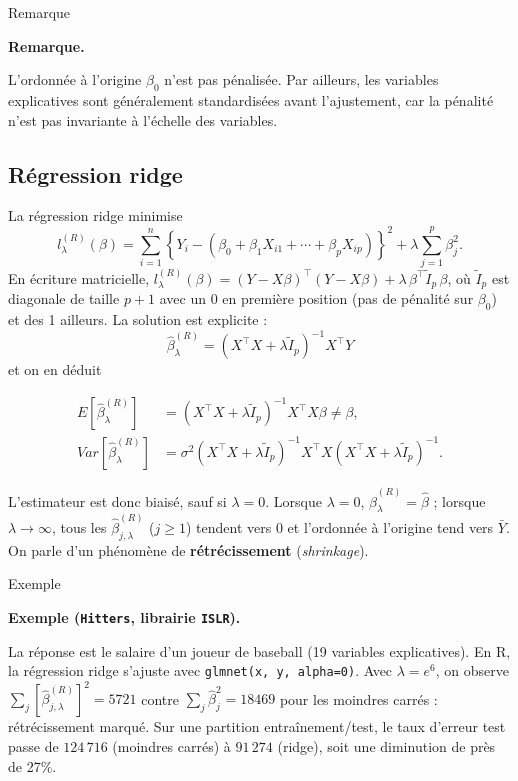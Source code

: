 \documentclass[
  french,
  letterpaper,
  DIV=11,
  numbers=noendperiod]{scrreprt}
\begin{document}
{Remarque}

\textbf{Remarque.}

L'ordonnée à l'origine \(\beta_0\) n'est pas pénalisée. Par ailleurs,
les variables explicatives sont généralement standardisées avant
l'ajustement, car la pénalité n'est pas invariante à l'échelle des
variables.

\subsection{Régression ridge}\label{ruxe9gression-ridge}

La régression ridge minimise
\[l^{(R)}_\lambda(\beta) = \sum_{i=1}^n\left\{Y_i - (\beta_0 + \beta_1 X_{i1} + \cdots + \beta_p X_{ip})\right\}^2 + \lambda\sum_{j=1}^p\beta_j^2.\]
En écriture matricielle,
\(l^{(R)}_\lambda(\beta) = (Y - X\beta)^\top(Y-X\beta) + \lambda\,\beta^\top\tilde I_p\,\beta\),
où \(\tilde I_p\) est diagonale de taille \(p+1\) avec un 0 en première
position (pas de pénalité sur \(\beta_0\)) et des 1 ailleurs. La
solution est explicite :
\[\boxed{\hat\beta^{(R)}_\lambda = (X^\top X + \lambda\tilde I_p)^{-1}X^\top Y}\]
et on en déduit

\[
\begin{aligned}
E[\hat\beta^{(R)}_\lambda] &= (X^\top X + \lambda\tilde I_p)^{-1}X^\top X\beta \neq \beta,\\
Var[\hat\beta^{(R)}_\lambda] &= \sigma^2(X^\top X + \lambda\tilde I_p)^{-1}X^\top X(X^\top X + \lambda\tilde I_p)^{-1}.
\end{aligned}
\]

L'estimateur est donc biaisé, sauf si \(\lambda = 0\). Lorsque
\(\lambda = 0\), \(\hat\beta^{(R)}_\lambda = \hat\beta\) ; lorsque
\(\lambda\to\infty\), tous les \(\hat\beta^{(R)}_{j,\lambda}\)
(\(j\geq1\)) tendent vers 0 et l'ordonnée à l'origine tend vers
\(\bar Y\). On parle d'un phénomène de \textbf{rétrécissement}
(\emph{shrinkage}).

{Exemple}

\textbf{Exemple (\texttt{Hitters}, librairie \texttt{ISLR}).}

La réponse est le salaire d'un joueur de baseball (19 variables
explicatives). En R, la régression ridge s'ajuste avec
\texttt{glmnet(x,\ y,\ alpha=0)}. Avec \(\lambda = e^6\), on observe
\(\sum_j[\hat\beta^{(R)}_{j,\lambda}]^2 = 5721\) contre
\(\sum_j\hat\beta_j^2 = 18469\) pour les moindres carrés :
rétrécissement marqué. Sur une partition entraînement/test, le taux
d'erreur test passe de \(124\,716\) (moindres carrés) à \(91\,274\)
(ridge), soit une diminution de près de 27\%.
\end{document}
